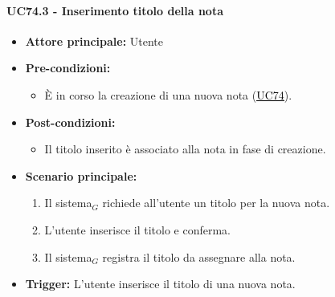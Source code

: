 \documentclass[a4paper, 10pt]{article}
\newcommand{\uclink}[2]{\hyperlink{#1}{\textcolor{black}{\underline{#2}}}}
\begin{document}
\paragraph{UC74.3 - Inserimento titolo della nota}
\hypertarget{uc:74.3}{}
\begin{itemize}
    \item \textbf{Attore principale:} Utente
    \item \textbf{Pre-condizioni:}
        \begin{itemize}
            \item È in corso la creazione di una nuova nota (\uclink{uc:74}{UC74}).
        \end{itemize}
    \item \textbf{Post-condizioni:}
        \begin{itemize}
            \item Il titolo inserito è associato alla nota in fase di creazione.
        \end{itemize}
    \item \textbf{Scenario principale:}
        \begin{enumerate}
            \item Il sistema$_G$ richiede all'utente un titolo per la nuova nota.
            \item L'utente inserisce il titolo e conferma.
            \item Il sistema$_G$ registra il titolo da assegnare alla nota.
        \end{enumerate}
    \item \textbf{Trigger:} L'utente inserisce il titolo di una nuova nota.
\end{itemize}
\end{document}
